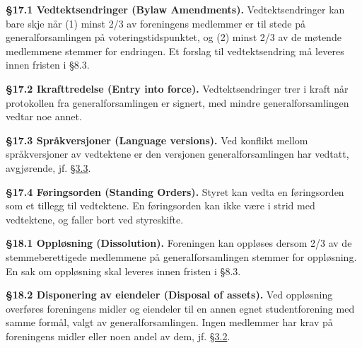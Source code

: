 \documentclass{../../../Common/Latex/Templates/rapport}
\begin{document}

\label{bylaw:17}
\textbf{\S 17.1 Vedtektsendringer (Bylaw Amendments).}\label{bylaw:17.1} Vedtektsendringer kan bare skje når (1) minst 2/3 av foreningens medlemmer er til stede på generalforsamlingen på voteringstidspunktet, og (2) minst 2/3 av de møtende medlemmene stemmer for endringen. Et forslag til vedtektsendring må leveres innen fristen i \S8.3.

\textbf{\S 17.2 Ikrafttredelse (Entry into force).}\label{bylaw:17.2} Vedtektsendringer trer i kraft når protokollen fra generalforsamlingen er signert, med mindre generalforsamlingen vedtar noe annet.

\textbf{\S 17.3 Språkversjoner (Language versions).}\label{bylaw:17.3} Ved konflikt mellom språkversjoner av vedtektene er den versjonen generalforsamlingen har vedtatt, avgjørende, jf. \hyperref[bylaw:3.3]{\S 3.3}.

\textbf{\S 17.4 Føringsorden (Standing Orders).}\label{bylaw:17.4} Styret kan vedta en føringsorden som et tillegg til vedtektene. En føringsorden kan ikke være i strid med vedtektene, og faller bort ved styreskifte.

\label{bylaw:18}
\textbf{\S 18.1 Oppløsning (Dissolution).}\label{bylaw:18.1} Foreningen kan oppløses dersom 2/3 av de stemmeberettigede medlemmene på generalforsamlingen stemmer for oppløsning. En sak om oppløsning skal leveres innen fristen i \S8.3.

\textbf{\S 18.2 Disponering av eiendeler (Disposal of assets).}\label{bylaw:18.2} Ved oppløsning overføres foreningens midler og eiendeler til en annen egnet studentforening med samme formål, valgt av generalforsamlingen. Ingen medlemmer har krav på foreningens midler eller noen andel av dem, jf. \hyperref[bylaw:3.2]{\S 3.2}.
\end{document}
